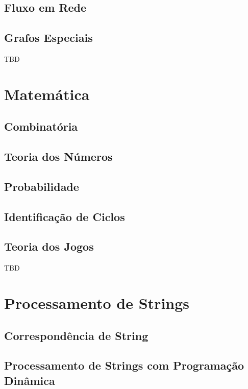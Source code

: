 \documentclass[11pt]{scrartcl}
\begin{document}
\subsection{Fluxo em Rede}

\subsection{Grafos Especiais}

TBD


\section{Matemática}

\subsection{Combinatória}

\subsection{Teoria dos Números}

\subsection{Probabilidade}

\subsection{Identificação de Ciclos}

\subsection{Teoria dos Jogos}

TBD


\section{Processamento de Strings}

\subsection{Correspondência de String}

\subsection{Processamento de Strings com Programação Dinâmica}
\end{document}
